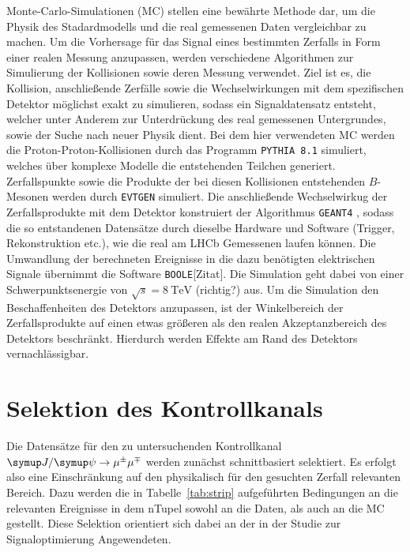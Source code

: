 Monte-Carlo-Simulationen (MC) stellen eine bewährte Methode dar, um die Physik des Stadardmodells und die real gemessenen Daten vergleichbar zu machen. Um die Vorhersage für das Signal eines bestimmten Zerfalls in Form einer realen Messung anzupassen, werden verschiedene Algorithmen zur Simulierung der Kollisionen sowie deren Messung verwendet. Ziel ist es, die Kollision, anschließende Zerfälle sowie die Wechselwirkungen mit dem spezifischen Detektor möglichst exakt zu simulieren, sodass ein Signaldatensatz entsteht, welcher unter Anderem zur Unterdrückung des real gemessenen Untergrundes, sowie der Suche nach neuer Physik dient. Bei dem hier verwendeten MC werden die Proton-Proton-Kollisionen durch das Programm \texttt{PYTHIA 8.1} \cite{pythia} simuliert, welches über komplexe Modelle die entstehenden Teilchen generiert. Zerfallspunkte sowie die Produkte der bei diesen Kollisionen entstehenden $B$-Mesonen werden durch \texttt{EVTGEN} \cite{evtgen} simuliert. Die anschließende Wechselwirkug der Zerfallsprodukte mit dem Detektor konstruiert der Algorithmus \texttt{GEANT4}  \cite{geant4}, sodass die so entstandenen Datensätze durch dieselbe Hardware und Software (Trigger, Rekonstruktion etc.), wie die real am LHCb Gemessenen laufen können. Die Umwandlung der berechneten Ereignisse in die dazu benötigten elektrischen Signale übernimmt die Software \texttt{BOOLE}[Zitat]. Die Simulation geht dabei von einer Schwerpunktsenergie von $\sqrt{s}=\SI{8}{\tera\electronvolt}$ (richtig?) aus. Um die Simulation den Beschaffenheiten des Detektors anzupassen, ist der Winkelbereich der Zerfallsprodukte auf einen etwas größeren als den realen Akzeptanzbereich des Detektors beschränkt. Hierdurch werden Effekte am Rand des Detektors vernachlässigbar.

\section{Selektion des Kontrollkanals}
%
Die Datensätze für den zu untersuchenden Kontrollkanal $\kontroll$ werden zunächst schnittbasiert selektiert. Es erfolgt also eine Einschränkung auf den physikalisch für den gesuchten Zerfall relevanten Bereich. Dazu werden die in Tabelle~\ref{tab:strip} aufgeführten Bedingungen an die relevanten Ereignisse in dem nTupel sowohl an die Daten, als auch an die MC gestellt. Diese Selektion orientiert sich dabei an der in der Studie zur Signaloptimierung \cite{ba-maik} Angewendeten.

